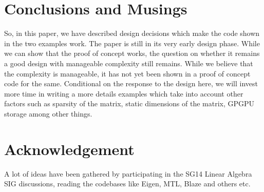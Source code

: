 \documentclass[oneside,11pt,a4paper]{jbarticle}
\begin{document}
\section{Conclusions and Musings}

So, in this paper, we have described design decisions which make the code shown
in the two examples work.  The paper is still in its very early design phase.
While we can show that the proof of concept works, the question on whether it
remains a good design with manageable complexity still remains. While we believe
that the complexity is manageable, it has not yet been shown in a proof of
concept code for the same. Conditional on the response to the design here, we
will invest more time in writing a more details examples which take into account
other factors such as sparsity of the matrix, static dimensions of the matrix,
GPGPU storage among other things.

\section{Acknowledgement}
A lot of ideas have been gathered by participating in the SG14 Linear Algebra
SIG discussions, reading the codebases like Eigen, MTL, Blaze and others etc.

\printbibliography
\end{document}
